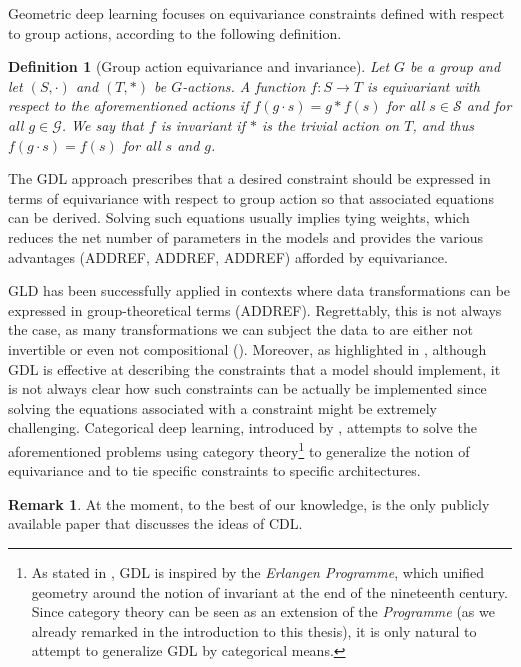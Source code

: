 \documentclass[11pt,a4paper,openright,twoside]{report}
\theoremstyle{plain}
\newtheorem{definition}[proposition]{Definition}
\theoremstyle{definition}
\newtheorem{remark}[proposition]{Remark}
\begin{document}
Geometric deep learning focuses on equivariance constraints defined with respect to group actions, according to the following definition.

\begin{definition}[Group action equivariance and invariance]
  Let $G$ be a group and let $(S, \cdot)$ and $(T, \ast)$ be $G$-actions. A function $f: S \to T$ is equivariant with respect to the aforementioned actions if $f(g \cdot s) = g \ast f(s)$ for all $s \in \mathcal{S}$ and for all $g \in \mathcal{G}$. We say that $f$ is invariant if $\ast$ is the trivial action on $T$, and thus $f(g \cdot s) = f(s)$ for all $s$ and $g$.
\end{definition}

The GDL approach prescribes that a desired constraint should be expressed in terms of equivariance with respect to group action so that associated equations can be derived. Solving such equations usually implies tying weights, which reduces the net number of parameters in the models and provides the various advantages (ADDREF, ADDREF, ADDREF) afforded by equivariance.


GLD has been successfully applied in contexts where data transformations can be expressed in group-theoretical terms (ADDREF). Regrettably, this is not always the case, as many transformations we can subject the data to are either not invertible or even not compositional (\cite{gavranovicposition}). Moreover, as highlighted in \cite{gavranovicposition}, although GDL is effective at describing the constraints that a model should implement, it is not always clear how such constraints can be actually be implemented since solving the equations associated with a constraint might be extremely challenging.  
Categorical deep learning, introduced by \cite{gavranovicposition}, attempts to solve the aforementioned problems using category theory\footnote{As stated in \cite{bronstein2021geometric}, GDL is inspired by the \textit{Erlangen Programme}, which unified geometry around the notion of invariant at the end of the nineteenth century. Since category theory can be seen as an extension of the \textit{Programme} (as we already remarked in the introduction to this thesis), it is only natural to attempt to generalize GDL by categorical means.} to generalize the notion of equivariance and to tie specific constraints to specific architectures.

\begin{remark}
  At the moment, to the best of our knowledge,  \cite{gavranovicposition} is the only publicly available paper that discusses the ideas of CDL. 
\end{remark}
\end{document}
